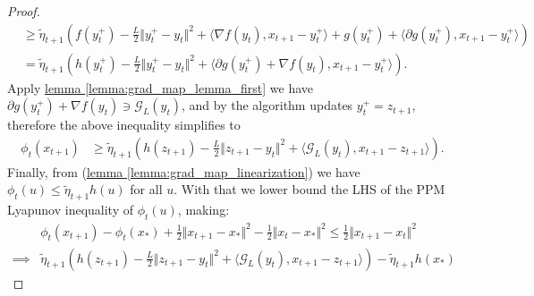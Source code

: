 \documentclass[12pt]{article}
\begin{document}
\begin{proof}
{\begin{align*}
                    &\ge 
                    \tilde\eta_{t + 1}
                    \left(
                        f(y_t^+) - \frac{L}{2}\Vert y_t^+ - y_t\Vert^2 
                        +
                        \langle \nabla f(y_t), x_{t + 1} - y_t^+\rangle
                        + 
                        g(y_t^+) + 
                        \langle \partial g(y_t^+), x_{t + 1} - y_t^+\rangle
                    \right) 
                    \\
                    &= 
                    \tilde\eta_{t + 1}
                    \left(
                        h(y_t^+) - \frac{L}{2}\Vert y_t^+ - y_t\Vert^2 
                        + 
                        \langle \partial g(y_t^+) + \nabla f(y_t), x_{t + 1} - y_t^+\rangle
                    \right).
                \end{align*}
            }
            Apply
            \hyperref[lemma:grad_map_lemma_first]{lemma \ref*{lemma:grad_map_lemma_first}} 
            we have $\partial g(y_t^+) + \nabla f(y_t) \ni \mathcal G_L(y_t)$, and by the algorithm updates $y_t^+ = z_{t + 1}$, therefore the above inequality simplifies to 
            \begin{align*}
                \phi_t(x_{t + 1}) &\ge 
                \tilde\eta_{t + 1} 
                \left(
                    h(z_{t + 1}) - 
                    \frac{L}{2}\Vert z_{t + 1} - y_t\Vert^2
                    + 
                    \langle \mathcal G_L(y_t), x_{t +1} - z_{t + 1}\rangle
                \right). 
            \end{align*}
            Finally, from (\hyperref[lemma:grad_map_linearization]
                {lemma \ref*{lemma:grad_map_linearization}})
            we have $\phi_t(u) \le \tilde\eta_{t + 1}h(u)$ for all $u$. 
            With that we lower bound the LHS of the PPM Lyapunov inequality of $\phi_t(u)$, making: 
            {\footnotesize
            \begin{align*}
                & \phi_t(x_{t + 1}) - \phi_t(x_*) + 
                \frac{1}{2}\Vert x_{t+1} - x_*\Vert^2 - 
                \frac{1}{2}\Vert x_t - x_*\Vert^2
                \le
                \frac{1}{2}\Vert x_{t + 1} - x_t\Vert^2 
                \\
                \implies &
                \tilde \eta_{t + 1}
                \left(
                    h(z_{t + 1}) - 
                    \frac{L}{2}\Vert z_{t + 1} - y_t\Vert^2
                    + 
                    \langle \mathcal G_L(y_t), x_{t +1} - z_{t + 1}\rangle
                \right) - \tilde \eta_{t + 1} h(x_*)

\end{align*}}
\end{proof}
\end{document}
